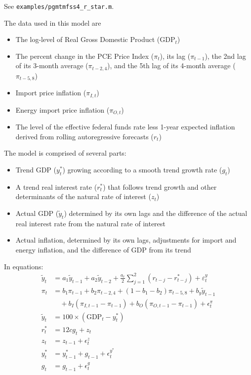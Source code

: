 \documentclass{article}
\begin{document}
See \texttt{examples/pgmtmfss4\_r\_star.m}. 

The data used in this model are
\begin{itemize}
  \item The log-level of Real Gross Domestic Product ($\text{GDP}_t$)
  \item The percent change in the PCE Price Index ($\pi_t$), its lag ($\pi_{t-1}$), the 2nd lag of its 3-month average ($\pi_{t-2,4}$), and the 5th lag of its 4-month average ($\pi_{t-5,8}$)
  \item Import price inflation ($\pi_{I,t}$)
  \item Energy import price inflation ($\pi_{O,t}$)
  \item The level of the effective federal funds rate less 1-year expected inflation derived from rolling autoregressive forecasts ($r_t$)
\end{itemize}

The model is comprised of several parts: 
\begin{itemize}
  \item Trend GDP ($y_t^*$) growing according to a smooth trend growth rate ($g_t$) 
  \item A trend real interest rate ($r_t^*$) that follows trend growth and other determinants of the natural rate of interest ($z_t$)
  \item Actual GDP ($\tilde{y}_t$) determined by its own lags and the difference of the actual real interest rate from the natural rate of interest
  \item Actual inflation, determined by its own lags, adjustments for import and energy inflation, and the difference of GDP from its trend
\end{itemize}
In equations: 
\begin{align*}
  \tilde{y}_t &= a_1 \tilde{y}_{t-1} + a_2 \tilde{y}_{t-2} + \frac{a_r}{2} \sum_{j=1}^{2} \left(r_{t-j} -r_{t-j}^* \right) + \varepsilon_t^y \\
  \pi_t &= b_1 \pi_{t-1} + b_2 \pi_{t-2,4} + (1-b_1-b_2)\pi_{t-5,8} + b_y \tilde{y}_{t-1} \\
  &\quad + b_I (\pi_{I, t-1} - \pi_{t-1}) + b_O (\pi_{O,t-1} - \pi_{t-1}) + \epsilon_t^\pi \\
  \tilde{y}_t &= 100 \times (\text{GDP}_t - y_t^*) \\
  r_t^* &= 12 c g_t + z_t \\
  z_t &= z_{t-1} + \epsilon_t^z \\
  y_t^* &= y_{t-1}^* + g_{t-1} + \epsilon_t^{y^*} \\
  g_t &= g_{t-1} + \epsilon_t^g
\end{align*}
\end{document}
